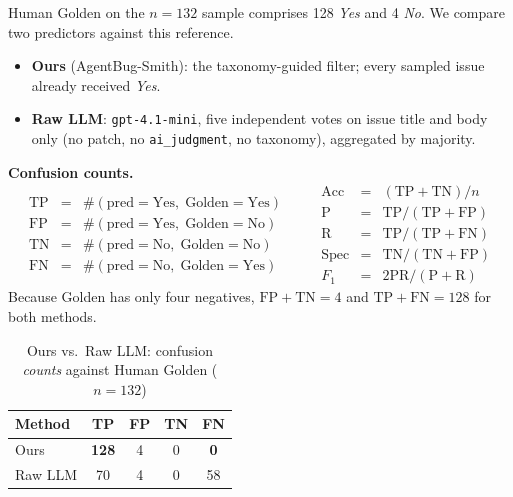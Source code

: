 \documentclass[11pt]{article}
\begin{document}
Human Golden on the $n=132$ sample comprises 128 \emph{Yes} and 4 \emph{No}. We compare two predictors against this reference.

\begin{itemize}
  \item \textbf{Ours} (AgentBug-Smith): the taxonomy-guided filter; every sampled issue already received \emph{Yes}.
  \item \textbf{Raw LLM}: \texttt{gpt-4.1-mini}, five independent votes on issue title and body only (no patch, no \texttt{ai\_judgment}, no taxonomy), aggregated by majority.
\end{itemize}

\noindent\textbf{Confusion counts.}
\[
\begin{array}{rcl}
\mathrm{TP} &=& \#(\mathrm{pred}=\mathrm{Yes},\;\mathrm{Golden}=\mathrm{Yes}) \\
\mathrm{FP} &=& \#(\mathrm{pred}=\mathrm{Yes},\;\mathrm{Golden}=\mathrm{No}) \\
\mathrm{TN} &=& \#(\mathrm{pred}=\mathrm{No},\;\mathrm{Golden}=\mathrm{No}) \\
\mathrm{FN} &=& \#(\mathrm{pred}=\mathrm{No},\;\mathrm{Golden}=\mathrm{Yes})
\end{array}
\qquad
\begin{array}{rcl}
\mathrm{Acc} &=& (\mathrm{TP}+\mathrm{TN})/n \\
\mathrm{P} &=& \mathrm{TP}/(\mathrm{TP}+\mathrm{FP}) \\
\mathrm{R} &=& \mathrm{TP}/(\mathrm{TP}+\mathrm{FN}) \\
\mathrm{Spec} &=& \mathrm{TN}/(\mathrm{TN}+\mathrm{FP}) \\
F_1 &=& 2\mathrm{PR}/(\mathrm{P}+\mathrm{R})
\end{array}
\]
Because Golden has only four negatives, $\mathrm{FP}+\mathrm{TN}=4$ and $\mathrm{TP}+\mathrm{FN}=128$ for both methods.

\begin{table}[htbp]
  \caption{Ours vs.\ Raw LLM: confusion \emph{counts} against Human Golden ($n=132$)}
  \label{tab:ours-vs-raw-counts}
  \centering
  \begin{tabular}{lcccc}
    \toprule
    \textbf{Method} & TP & FP & TN & FN \\
    \midrule
    Ours     & \textbf{128} & 4 & 0 & \textbf{0} \\
    Raw LLM  & 70  & 4 & 0 & 58 \\
    \bottomrule
  \end{tabular}
\end{table}
\end{document}
